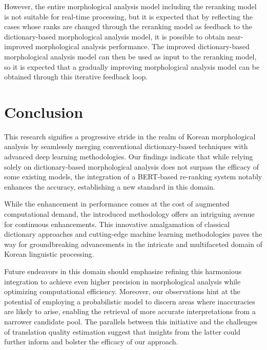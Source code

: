 \documentclass[AMS,STIX2COL]{WileyNJD-v2}
\begin{document}
    However, the entire morphological analysis model including the reranking model is not suitable for real-time processing, but it is expected that by reflecting the cases whose ranks are changed through the reranking model as feedback to the dictionary-based morphological analysis model, it is possible to obtain near-improved morphological analysis performance. The improved dictionary-based morphological analysis model can then be used as input to the reranking model, so it is expected that a gradually improving morphological analysis model can be obtained through this iterative feedback loop.


    \section{Conclusion}\label{sec:conclusion}

    This research signifies a progressive stride in the realm of Korean morphological analysis by seamlessly merging conventional dictionary-based techniques with advanced deep learning methodologies. Our findings indicate that while relying solely on dictionary-based morphological analysis does not surpass the efficacy of some existing models, the integration of a BERT-based re-ranking system notably enhances the accuracy, establishing a new standard in this domain.

    While the enhancement in performance comes at the cost of augmented computational demand, the introduced methodology offers an intriguing avenue for continuous enhancements. This innovative amalgamation of classical dictionary approaches and cutting-edge machine learning methodologies paves the way for groundbreaking advancements in the intricate and multifaceted domain of Korean linguistic processing.

    Future endeavors in this domain should emphasize refining this harmonious integration to achieve even higher precision in morphological analysis while optimizing computational efficiency. Moreover, our observations hint at the potential of employing a probabilistic model to discern areas where inaccuracies are likely to arise, enabling the retrieval of more accurate interpretations from a narrower candidate pool. The parallels between this initiative and the challenges of translation quality estimation suggest that insights from the latter could further inform and bolster the efficacy of our approach.


    
\end{document}
